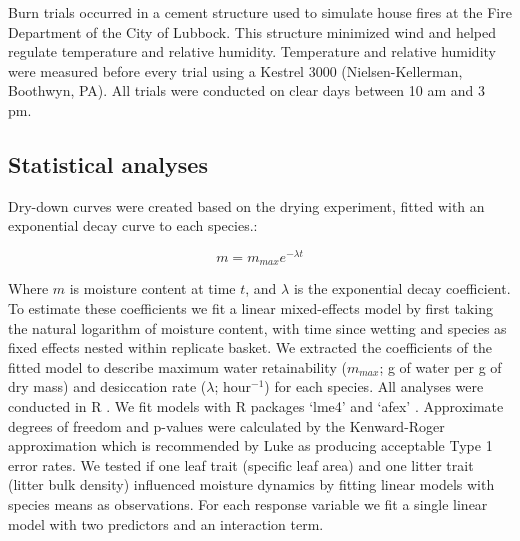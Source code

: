 \documentclass[letterpaper,12pt]{article}
\begin{document}
Burn trials occurred in a cement structure used to simulate house fires at the
Fire Department of the City of Lubbock. This structure minimized wind and
helped regulate temperature and relative humidity. Temperature and relative
humidity were measured before every trial using a Kestrel 3000
(Nielsen-Kellerman, Boothwyn, PA). All trials were conducted on clear days
between 10 am and 3 pm.

\subsection*{Statistical analyses}

Dry-down curves were created based on the drying experiment, fitted with an
exponential decay curve to each species.:

\begin{equation}
m = m_{max} e^{-\lambda t}
\end{equation}

Where $m$ is moisture content at time $t$, and $\lambda$ is the exponential
decay coefficient. To estimate these coefficients we fit a linear mixed-effects
model by first taking the natural logarithm of moisture content, with time
since wetting and species as fixed effects nested within replicate basket. We
extracted the coefficients of the fitted model to describe maximum water
retainability ($m_{max}$; g of water per g of dry mass) and desiccation rate
($\lambda$; hour$^{-1}$) for each species. All analyses were conducted in R
\citep{RCoreTeam-2019}. We fit models with R packages `lme4'
\citep{Bates_Machler_etal-2015} and `afex' \citep{Singmann_Bolker_etal-2017}.
Approximate degrees of freedom and p-values were calculated by the
Kenward-Roger approximation \citep{Kenward_Roger-1997} which is recommended by
Luke \citep{Luke-2017} as producing acceptable Type 1 error rates. We tested if
one leaf trait (specific leaf area) and one litter trait (litter bulk density)
influenced moisture dynamics by fitting linear models with species means as
observations. For each response variable we fit a single linear model with two
predictors and an interaction term.
\end{document}
